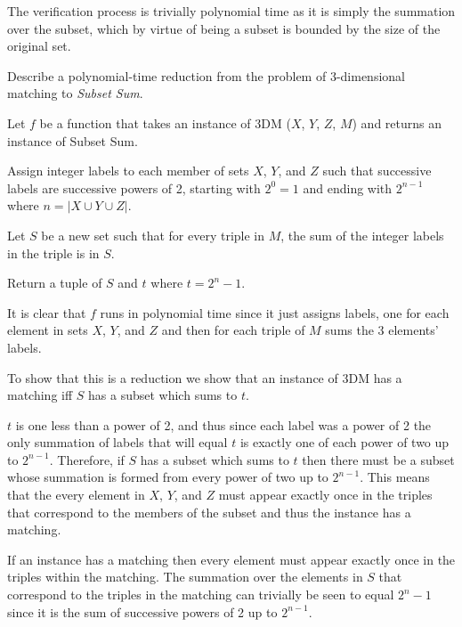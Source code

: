 \documentclass{supervision}
\begin{document}
\begin{questions}
\begin{parts}
\begin{subparts}
\begin{solution}
                The verification process is trivially polynomial time as it is
                simply the summation over the subset, which by virtue of being
                a subset is bounded by the size of the original set.
              \end{solution}

            \subpart[9] Describe a polynomial-time reduction from the problem of
              3-dimensional matching to \emph{Subset Sum}.
              \begin{solution}
                Let $f$ be a function that takes an instance of 3DM ($X$, $Y$,
                $Z$, $M$) and returns an instance of Subset Sum.

                Assign integer labels to each member of sets $X$, $Y$, and $Z$
                such that successive labels are successive powers of 2, starting
                with $2^0 = 1$ and ending with $2^{n-1}$ where $n = |X \cup Y
                \cup Z|$.

                Let $S$ be a new set such that for every triple in $M$, the sum
                of the integer labels in the triple is in $S$.

                Return a tuple of $S$ and $t$ where $t = 2^n - 1$.

                It is clear that $f$ runs in polynomial time since it just
                assigns labels, one for each element in sets $X$, $Y$, and $Z$
                and then for each triple of $M$ sums the 3 elements' labels.

                To show that this is a reduction we show that an instance of 3DM
                has a matching iff $S$ has a subset which sums to $t$.

                $t$ is one less than a power of 2, and thus since each label
                was a power of 2 the only summation of labels that will equal
                $t$ is exactly one of each power of two up to $2^{n-1}$.
                Therefore, if $S$ has a subset which sums to $t$ then there must
                be a subset whose summation is formed from every power of two up
                to $2^{n-1}$. This means that the every element in $X$, $Y$, and
                $Z$ must appear exactly once in the triples that correspond to
                the members of the subset and thus the instance has a matching.

                If an instance has a matching then every element must appear
                exactly once in the triples within the matching. The summation
                over the elements in $S$ that correspond to the triples in the
                matching can trivially be seen to equal $2^n - 1$ since it is
                the sum of successive powers of 2 up to $2^{n-1}$.
              \end{solution}


\end{subparts}
\end{parts}
\end{questions}
\end{document}
